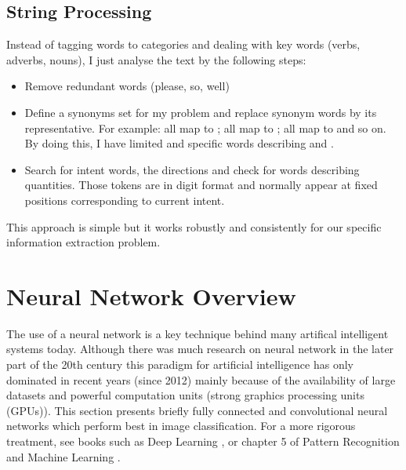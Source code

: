\subsection{String Processing}
Instead of tagging words to categories and dealing with key words (verbs, adverbs, nouns), I just analyse the text by the following steps:
\begin{itemize}
	\item Remove redundant words (please, so, well)
	\item Define a synonyms set for my problem and replace synonym words by its representative. For example:  all map to ;  all map to ;  all map to  and so on. By doing this, I have limited and specific words describing  and .
	\item Search for intent words, the directions and check for words describing quantities. Those tokens are in digit format and normally appear at fixed positions corresponding to current intent.
\end{itemize}

This approach is simple but it works robustly and consistently for our specific information extraction problem.

\section{Neural Network Overview}
\label{sec:neuralNet}
The use of a neural network is a key technique behind many artifical intelligent systems today. Although there was much research on neural network in the later part of the 20th century \cite{Bishop:1995:NNP:525960} this paradigm for artificial intelligence has only dominated in recent years (since 2012) mainly because of the availability of large datasets and powerful computation units (strong graphics processing units (GPUs)). This section presents briefly fully connected and convolutional neural networks which perform best in image classification. For a more rigorous treatment, see books such as Deep Learning \cite{Goodfellow-et-al-2016}, or chapter 5 of Pattern Recognition and Machine Learning \cite{Bishop:2006:PRM:1162264}.

